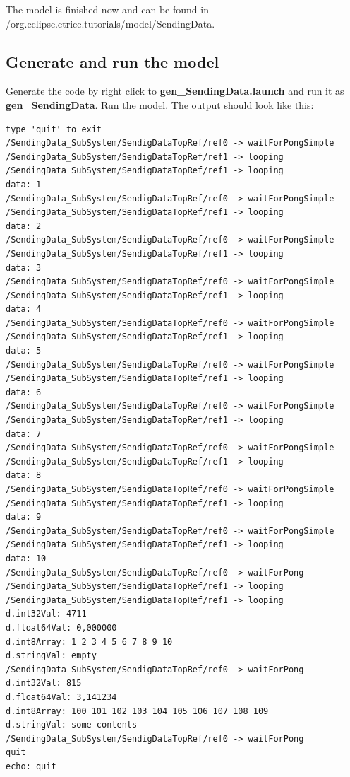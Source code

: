 \begin{flushleft}The model is finished now and can be found in 
/org.eclipse.etrice.tutorials/model/SendingData.\end{flushleft}

\subsection{Generate and run the model}

Generate the code by right click to \textbf{gen\_SendingData.launch} and run it as 
\textbf{gen\_SendingData}. Run the model. 
The output should look like this:

\begin{verbatim}
type 'quit' to exit
/SendingData_SubSystem/SendigDataTopRef/ref0 -> waitForPongSimple
/SendingData_SubSystem/SendigDataTopRef/ref1 -> looping
/SendingData_SubSystem/SendigDataTopRef/ref1 -> looping
data: 1
/SendingData_SubSystem/SendigDataTopRef/ref0 -> waitForPongSimple
/SendingData_SubSystem/SendigDataTopRef/ref1 -> looping
data: 2
/SendingData_SubSystem/SendigDataTopRef/ref0 -> waitForPongSimple
/SendingData_SubSystem/SendigDataTopRef/ref1 -> looping
data: 3
/SendingData_SubSystem/SendigDataTopRef/ref0 -> waitForPongSimple
/SendingData_SubSystem/SendigDataTopRef/ref1 -> looping
data: 4
/SendingData_SubSystem/SendigDataTopRef/ref0 -> waitForPongSimple
/SendingData_SubSystem/SendigDataTopRef/ref1 -> looping
data: 5
/SendingData_SubSystem/SendigDataTopRef/ref0 -> waitForPongSimple
/SendingData_SubSystem/SendigDataTopRef/ref1 -> looping
data: 6
/SendingData_SubSystem/SendigDataTopRef/ref0 -> waitForPongSimple
/SendingData_SubSystem/SendigDataTopRef/ref1 -> looping
data: 7
/SendingData_SubSystem/SendigDataTopRef/ref0 -> waitForPongSimple
/SendingData_SubSystem/SendigDataTopRef/ref1 -> looping
data: 8
/SendingData_SubSystem/SendigDataTopRef/ref0 -> waitForPongSimple
/SendingData_SubSystem/SendigDataTopRef/ref1 -> looping
data: 9
/SendingData_SubSystem/SendigDataTopRef/ref0 -> waitForPongSimple
/SendingData_SubSystem/SendigDataTopRef/ref1 -> looping
data: 10
/SendingData_SubSystem/SendigDataTopRef/ref0 -> waitForPong
/SendingData_SubSystem/SendigDataTopRef/ref1 -> looping
/SendingData_SubSystem/SendigDataTopRef/ref1 -> looping
d.int32Val: 4711
d.float64Val: 0,000000
d.int8Array: 1 2 3 4 5 6 7 8 9 10 
d.stringVal: empty
/SendingData_SubSystem/SendigDataTopRef/ref0 -> waitForPong
d.int32Val: 815
d.float64Val: 3,141234
d.int8Array: 100 101 102 103 104 105 106 107 108 109 
d.stringVal: some contents
/SendingData_SubSystem/SendigDataTopRef/ref0 -> waitForPong
quit
echo: quit
\end{verbatim}

